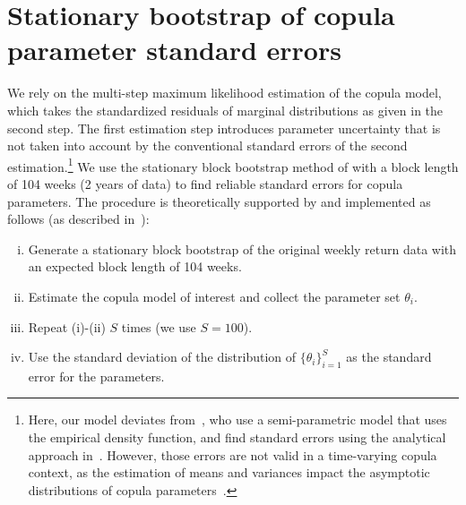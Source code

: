 
\section{Stationary bootstrap of copula parameter standard errors}
\label{app:Appendix_bootstrap}

We rely on the multi-step maximum likelihood estimation of the copula model, which takes the standardized residuals of marginal distributions as given in the second step. The first estimation step introduces parameter uncertainty that is not taken into account by the conventional standard errors of the second estimation.\footnote{Here, our model deviates from~\textcite{ChristoffersenLanglois2013}, who use a semi-parametric model that uses the empirical density function, and find standard errors using the analytical approach in~\textcite{ChenFan2006}. However, those errors are not valid in a time-varying copula context, as the estimation of means and variances impact the asymptotic distributions of copula parameters~\autocite{Remillard2010}.} We use the stationary block bootstrap method of \textcite{PolitisRomano1994} with a block length of 104 weeks (2 years of data) to find reliable standard errors for copula parameters. The procedure is theoretically supported by \textcite{GonclavesWhite2004} and implemented as follows (as described in~\textcite{Patton2012}):
\begin{enumerate}[(i)]
    \item Generate a stationary block bootstrap of the original weekly return data with an expected block length of 104 weeks.
    \item Estimate the copula model of interest and collect the parameter set $\theta_i$.
    \item Repeat (i)-(ii) $S$ times (we use $S = 100$).
    \item Use the standard deviation of the distribution of $\{\theta_i\}_{i=1}^S$ as the standard error for the parameters.
\end{enumerate}
